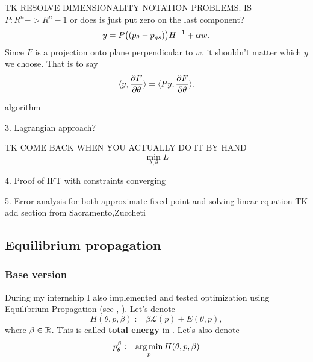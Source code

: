 \documentclass[a4paper,10pt]{report}
\begin{document}
TK RESOLVE DIMENSIONALITY NOTATION PROBLEMS. IS $P:R^n ->R^n-1$ or does is just put zero on the last component?
\begin{equation}
 y = P\big((p_\theta-p_{gs})\big)H^{-1} + \alpha w.
\end{equation}
Since $F$ is a projection onto plane perpendicular to $w$, it shouldn't matter which $y$ we choose.
That is to say
\begin{equation}
 \langle y,  \frac{\partial F}{\partial \theta} \rangle=\langle Py, \frac{\partial F}{\partial \theta} \rangle.
\end{equation}


algorithm




3. Lagrangian approach?

TK COME BACK WHEN YOU ACTUALLY DO IT BY HAND
 \begin{equation}
\min_{\lambda,\theta} L
 \end{equation}

4. Proof of IFT with constraints converging

5. Error analysis for both approximate fixed point and solving linear equation
TK add section from Sacramento,Zuccheti
\subsection{ Equilibrium propagation}

\subsubsection{Base version}
During my internship I also implemented and tested optimization using Equilibrium Propagation (see \cite{eqprop}, \cite{zucchet2022beyond}).
Let's denote
\begin{equation}
H(\theta, p, \beta) := \beta \mathcal{L}(p) + E(\theta, p),
\end{equation}
where $\beta \in \mathbb{R}$.
 This is called \textbf{total energy} in \cite{eqprop}. Let's also denote
\begin{equation}
p_{\theta}^{\beta}:=\operatorname*{arg\,min}_p H(\theta, p, \beta)
\end{equation}
\end{document}
